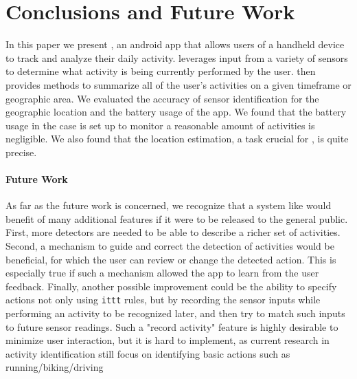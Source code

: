 \documentclass{acm_proc_article-sp}
\begin{document}

\section{Conclusions and Future Work}
In this paper we present \LS, an android app that allows users of a handheld device to track and analyze their daily activity. \LS leverages input from a variety of sensors to determine what activity is being currently performed by the user. \LS then provides methods to summarize all of the user's activities on a given timeframe or geographic area.
We evaluated the accuracy of sensor identification for the geographic location and the battery usage of the app. We found that the battery usage in the case \LS is set up to monitor a reasonable amount of activities is negligible. We also found that the location estimation, a task crucial for \LS, is quite precise.

\paragraph{Future Work} As far as the future work is concerned, we recognize that a system like \LS would benefit of many additional features if it were to be released to the general public. 
First, more detectors are needed to be able to describe a richer set of activities.
Second, a mechanism to guide and correct the detection of activities would be beneficial, for which the user can review or change the detected action. This is especially true if such a mechanism allowed the app to learn from the user feedback.
Finally, another possible improvement could be the ability to specify actions not only using {\tt ittt} rules, but by recording the sensor inputs while performing an activity to be recognized later, and then try to match such inputs to future sensor readings. Such a "record activity" feature is highly desirable to minimize user interaction, but it is hard to implement, as current research in activity identification still focus on identifying basic actions such as running/biking/driving ~\cite{mccallmacro}




\end{document}
